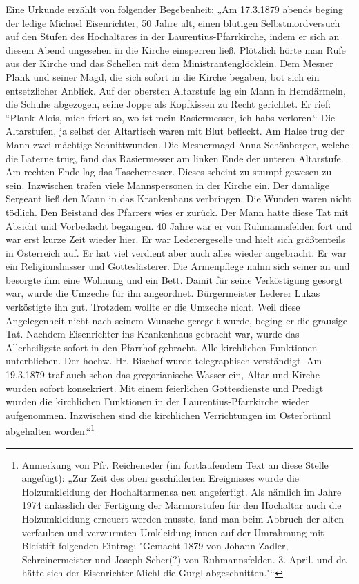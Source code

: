 \documentclass[12pt,a4paper]{book}
\begin{document}
Eine Urkunde erzählt von folgender Begebenheit: „Am 17.3.1879 abends beging der
ledige Michael Eisenrichter, 50 Jahre alt, einen blutigen Selbstmordversuch auf
den Stufen des Hochaltares in der Laurentius-Pfarrkirche, indem er sich an
diesem Abend ungesehen in die Kirche einsperren ließ. Plötzlich hörte man Rufe
aus der Kirche und das Schellen mit dem Ministrantenglöcklein. Dem Mesner Plank
und seiner Magd, die sich sofort in die Kirche begaben, bot sich ein
entsetzlicher Anblick. Auf der obersten Altarstufe lag ein Mann in Hemdärmeln,
die Schuhe abgezogen, seine Joppe als Kopfkissen zu Recht gerichtet. Er rief:
“Plank Alois, mich friert so, wo ist mein Rasiermesser, ich habs verloren.“ Die
Altarstufen, ja selbst der Altartisch waren mit Blut befleckt. Am Halse trug der
Mann zwei mächtige Schnittwunden. Die Mesnermagd Anna Schönberger, welche die
Laterne trug, fand das Rasiermesser am linken Ende der unteren Altarstufe. Am
rechten Ende lag das Taschemesser. Dieses scheint zu stumpf gewesen zu sein.
Inzwischen trafen viele Mannspersonen in der Kirche ein. Der damalige Sergeant
ließ den Mann in das Krankenhaus verbringen. Die Wunden waren nicht tödlich. Den
Beistand des Pfarrers wies er zurück. Der Mann hatte diese Tat mit Absicht und
Vorbedacht begangen. 40 Jahre war er von Ruhmannsfelden fort und war erst kurze
Zeit wieder hier. Er war Lederergeselle und hielt sich größtenteils in
Österreich auf. Er hat viel verdient aber auch alles wieder angebracht. Er war
ein Religionshasser und Gotteslästerer. Die Armenpflege nahm sich seiner an und
besorgte ihm eine Wohnung und ein Bett. Damit für seine Verköstigung gesorgt
war, wurde die Umzeche für ihn angeordnet. Bürgermeister Lederer Lukas
verköstigte ihn gut. Trotzdem wollte er die Umzeche nicht. Weil diese
Angelegenheit nicht nach seinem Wunsche geregelt wurde, beging er die grausige
Tat. Nachdem Eisenrichter ins Krankenhaus gebracht war, wurde das Allerheiligste
sofort in den Pfarrhof gebracht. Alle kirchlichen Funktionen unterblieben. Der
hochw. Hr. Bischof wurde telegraphisch verständigt. Am 19.3.1879 traf auch schon
das gregorianische Wasser ein, Altar und Kirche wurden sofort konsekriert. Mit
einem feierlichen Gottesdienste und Predigt wurden die kirchlichen Funktionen in
der Laurentius-Pfarrkirche wieder aufgenommen. Inzwischen sind die kirchlichen
Verrichtungen im Osterbrünnl abgehalten worden.“\footnote{Anmerkung von Pfr.
Reicheneder (im fortlaufendem Text an diese Stelle angefügt): „Zur Zeit des
oben geschilderten Ereignisses wurde die Holzumkleidung der Hochaltarmensa neu
angefertigt. Als nämlich im Jahre 1974 anlässlich der Fertigung der
Marmorstufen für den Hochaltar auch die Holzumkleidung erneuert werden musste,
fand man beim Abbruch der alten verfaulten und verwurmten Umkleidung innen auf
der Umrahmung mit Bleistift folgenden Eintrag: "Gemacht 1879 von Johann Zadler,
Schreinermeister und Joseph Scher(?) von Ruhmannsfelden. 3. April. und da hätte
sich der Eisenrichter Michl die Gurgl abgeschnitten."“}
\end{document}
